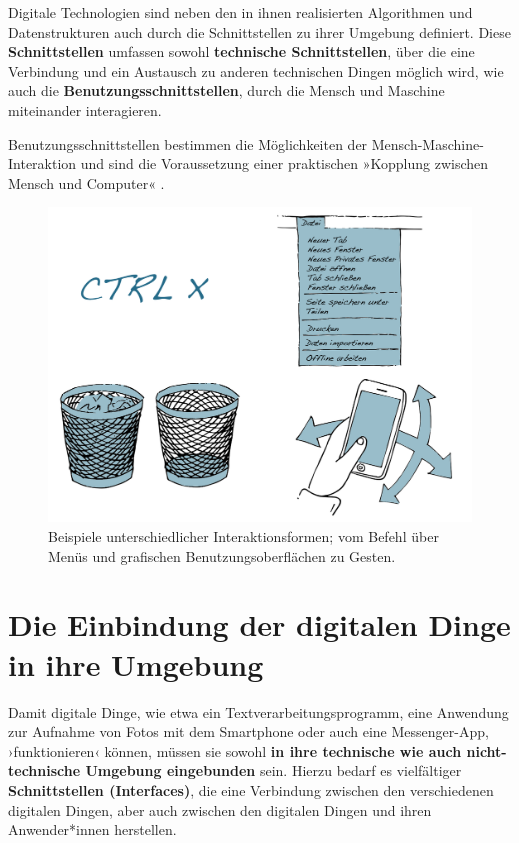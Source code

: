 \documentclass[
  a4paper,
]{book}
\begin{document}
Digitale Technologien sind neben den in ihnen realisierten Algorithmen und Datenstrukturen auch durch die Schnittstellen zu ihrer Umgebung definiert. Diese \textbf{Schnittstellen} umfassen sowohl \textbf{technische Schnittstellen}, über die eine Verbindung und ein Austausch zu anderen technischen Dingen möglich wird, wie auch die \textbf{Benutzungsschnittstellen}, durch die Mensch und Maschine miteinander interagieren.

Benutzungsschnittstellen bestimmen die Möglichkeiten der Mensch-Maschine-Interaktion und sind die Voraussetzung einer praktischen »Kopplung zwischen Mensch und Computer« \citep[S. 4]{herczegSoftwareergonomie2005}.

\begin{figure}

{\centering \includegraphics{Figures/11-01-Schnittstellen} 

}

\caption{Beispiele unterschiedlicher Interaktionsformen; vom Befehl über Menüs und grafischen Benutzungsoberflächen zu Gesten.}\label{fig:fig17}
\end{figure}

\section{Die Einbindung der digitalen Dinge in ihre Umgebung}\label{die-einbindung-der-digitalen-dinge-in-ihre-umgebung}

Damit digitale Dinge, wie etwa ein Textverarbeitungsprogramm, eine Anwendung zur Aufnahme von Fotos mit dem Smartphone oder auch eine Messenger-App, ›funktionieren‹ können, müssen sie sowohl \textbf{in ihre technische wie auch nicht-technische Umgebung eingebunden} sein. Hierzu bedarf es vielfältiger \textbf{Schnittstellen (Interfaces)}, die eine Verbindung zwischen den verschiedenen digitalen Dingen, aber auch zwischen den digitalen Dingen und ihren Anwender*innen herstellen.
\end{document}

